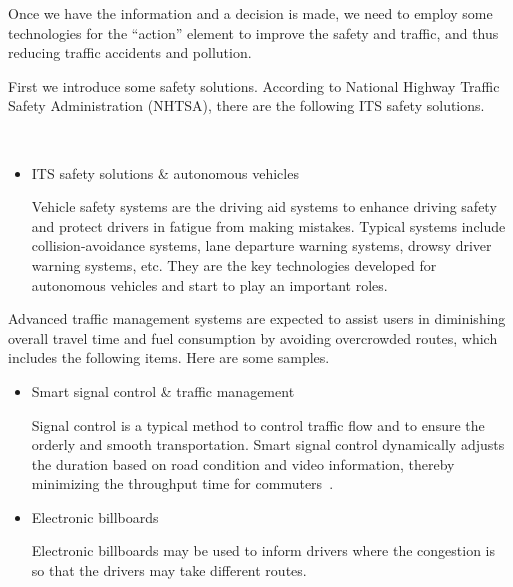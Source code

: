 \documentclass[letterpaper, twocolumn, 10pt, conference]{IEEEtran}
\begin{document}
Once we have the information and a decision is made, we need to employ some technologies for the \enquote{action} element to improve the safety and traffic, and thus reducing traffic accidents and pollution. 

First we introduce some safety solutions. According to National Highway Traffic Safety Administration (NHTSA), there are the following ITS safety solutions. 

\
\begin{itemize}

\item ITS safety solutions \& autonomous vehicles




Vehicle safety systems are the driving aid systems to enhance driving safety and protect drivers in fatigue from making mistakes. 
Typical systems include collision-avoidance systems, lane departure warning systems, drowsy driver warning systems, etc. They are the key technologies developed for autonomous vehicles and start to play an important roles. 





\end{itemize}


Advanced traffic management systems are expected to assist users in diminishing overall travel time and fuel consumption by avoiding overcrowded routes, which includes the following items. 
Here are some samples.

\begin{itemize}

\item Smart signal control \& traffic management

Signal control is a typical method to control traffic flow and to ensure the orderly and smooth transportation. Smart signal control dynamically adjusts the duration based on road condition and video information, thereby minimizing the throughput time for commuters~\cite{vidhya2014density}. 

\item Electronic billboards 

Electronic billboards may be used to inform drivers where the congestion is so that the drivers may take different routes.

\end{itemize}
\end{document}
